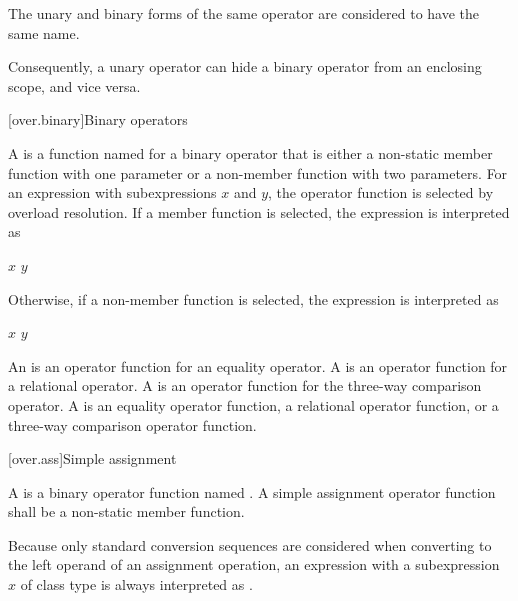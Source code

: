 \pnum
The unary and binary forms of the same operator are considered to have
the same name.
\begin{note}
Consequently, a unary operator can hide a binary
operator from an enclosing scope, and vice versa.
\end{note}

[over.binary]{Binary operators}%
%

\pnum
A 
is a function named 
for a binary operator  that is either
a non-static member function with one parameter or
a non-member function with two parameters.
%
For an expression  with subexpressions $x$ and $y$,
the operator function is selected by overload resolution.
If a member function is selected,
the expression is interpreted as
\begin{ncsimplebnf}
$x$    \terminal{(} $y$ \terminal{)}
\end{ncsimplebnf}
Otherwise, if a non-member function is selected,
the expression is interpreted as
\begin{ncsimplebnf}
  \terminal{(} $x$ \terminal{,} $y$ \terminal{)}
\end{ncsimplebnf}

\pnum
An  is an operator function
for an equality operator.
A  is an operator function
for a relational operator.
A  is an operator function
for the three-way comparison operator.
A  is
an equality operator function,
a relational operator function, or
a three-way comparison operator function.

[over.ass]{Simple assignment}
%

\pnum
A 
is a binary operator function named .
A simple assignment operator function shall be a non-static member function.
\begin{note}
Because only standard conversion sequences are considered when converting
to the left operand of an assignment operation,
an expression  with a subexpression $x$ of class type
is always interpreted as .
\end{note}

